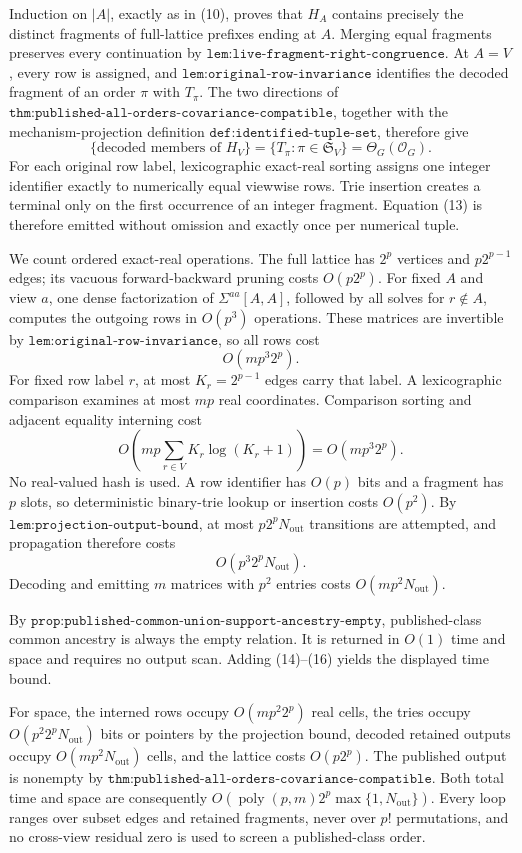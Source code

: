 Induction on \(|A|\), exactly as in (10), proves that \(H_A\) contains precisely the distinct fragments of full-lattice prefixes ending at \(A\).  Merging equal fragments preserves every continuation by \(\texttt{lem:live-fragment-right-congruence}\).  At \(A=V\), every row is assigned, and \(\texttt{lem:original-row-invariance}\) identifies the decoded fragment of an order \(\pi\) with \(T_\pi\).  The two directions of \(\texttt{thm:published-all-orders-covariance-compatible}\), together with the mechanism-projection definition \(\texttt{def:identified-tuple-set}\), therefore give
\[
 \{\text{decoded members of }H_V\}
 =\{T_\pi:\pi\in\mathfrak S_V\}
 =\Theta_G(\mathcal O_G).
 \tag{13}
\]
For each original row label, lexicographic exact-real sorting assigns one integer identifier exactly to numerically equal viewwise rows.  Trie insertion creates a terminal only on the first occurrence of an integer fragment.  Equation (13) is therefore emitted without omission and exactly once per numerical tuple.

We count ordered exact-real operations.  The full lattice has \(2^p\) vertices and \(p2^{p-1}\) edges; its vacuous forward-backward pruning costs \(O(p2^p)\).  For fixed \(A\) and view \(a\), one dense factorization of \(\Sigma^{aa}[A,A]\), followed by all solves for \(r\notin A\), computes the outgoing rows in \(O(p^3)\) operations.  These matrices are invertible by \(\texttt{lem:original-row-invariance}\), so all rows cost
\[
 O(mp^3 2^p).
 \tag{14}
\]
For fixed row label \(r\), at most \(K_r=2^{p-1}\) edges carry that label.  A lexicographic comparison examines at most \(mp\) real coordinates.  Comparison sorting and adjacent equality interning cost
\[
 O\!\left(mp\sum_{r\in V}K_r\log(K_r+1)\right)
 =O(mp^3 2^p).
 \tag{15}
\]
No real-valued hash is used.  A row identifier has \(O(p)\) bits and a fragment has \(p\) slots, so deterministic binary-trie lookup or insertion costs \(O(p^2)\).  By \(\texttt{lem:projection-output-bound}\), at most \(p2^pN_{\mathrm{out}}\) transitions are attempted, and propagation therefore costs
\[
 O(p^3 2^pN_{\mathrm{out}}).
 \tag{16}
\]
Decoding and emitting \(m\) matrices with \(p^2\) entries costs \(O(mp^2N_{\mathrm{out}})\).

By \(\texttt{prop:published-common-union-support-ancestry-empty}\), published-class common ancestry is always the empty relation.  It is returned in \(O(1)\) time and space and requires no output scan.  Adding (14)--(16) yields the displayed time bound.

For space, the interned rows occupy \(O(mp^2 2^p)\) real cells, the tries occupy \(O(p^2 2^pN_{\mathrm{out}})\) bits or pointers by the projection bound, decoded retained outputs occupy \(O(mp^2N_{\mathrm{out}})\) cells, and the lattice costs \(O(p2^p)\).  The published output is nonempty by \(\texttt{thm:published-all-orders-covariance-compatible}\).  Both total time and space are consequently \(O(\operatorname{poly}(p,m)2^p\max\{1,N_{\mathrm{out}}\})\).  Every loop ranges over subset edges and retained fragments, never over \(p!\) permutations, and no cross-view residual zero is used to screen a published-class order.

